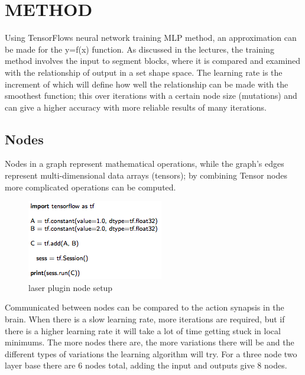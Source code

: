 \documentclass[a4paper, 10pt]{IEEEconf}
\begin{document}
\section{METHOD}

Using TensorFlows neural network training MLP method, an approximation can be made for the y=f(x) function. As discussed in the lectures, the training method involves the input to segment blocks, where it is compared and examined with the relationship of output in a set shape space. The learning rate is the increment of which will define how well the relationship can be made with the smoothest function; this over iterations with a certain node size (mutations) and can give a higher accuracy with more reliable results of many iterations. 

\subsection{Nodes}

Nodes in a graph represent mathematical operations, while the graph's edges represent multi-dimensional data arrays (tensors); by combining Tensor nodes more complicated operations can be computed.

\begin{figure}[H]
  \includegraphics[width=0.35\linewidth, center]{images/nodes}
  \caption{laser plugin node setup}
  \label{fig:laser plugin node setup}
\end{figure}

Communicated between nodes can be compared to the action synapsis in the brain. When there is a slow learning rate, more iterations are required, but if there is a higher learning rate it will take a lot of time getting stuck in local minimums. The more nodes there are, the more variations there will be and the different types of variations the learning algorithm will try. For a three node two layer base there are 6 nodes total, adding the input and outputs give 8 nodes.
\end{document}
